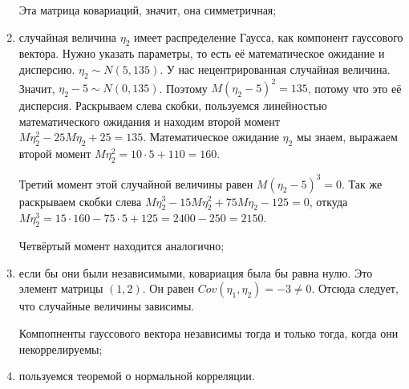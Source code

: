 \begin{enumerate}[label=\alph*)]
  Эта матрица ковариаций, значит, она симметричная;
  \item случайная величина $ \eta_2$ имеет распределение Гаусса, как компонент гауссового вектора.
  Нужно указать параметры, то есть её математическое ожидание и дисперсию.
  $ \eta_2 \sim N \left( 5, 135 \right) $.
  У нас нецентрированная случайная величина.
  Значит, $ \eta_2 - 5 \sim N \left( 0, 135 \right) $.
  Поэтому $M \left( \eta_2 - 5 \right)^2 = 135$, потому что это её дисперсия.
  Раскрываем слева скобки,
  пользуемся линейностью математического ожидания и находим второй момент
  $M \eta_2^2 - 25M \eta_2 + 25 =
    135$.
  Математическое ожидание $ \eta_2$ мы знаем,
  выражаем второй момент $M \eta_2^2 = 10 \cdot 5 + 110 = 160$.

  Третий момент этой случайной величины равен $M \left( \eta_2 - 5 \right)^3 = 0$.
  Так же раскрываем скобки слева $M \eta_2^3 - 15M \eta_2^2 + 75M \eta_2 - 125 = 0$,
  откуда $M \eta_2^3 = 15 \cdot 160 - 75 \cdot 5 + 125 = 2400 - 250 = 2150$.

  Четвёртый момент находится аналогично;
  \item если бы они были независимыми, ковариация была бы равна нулю.
  Это элемент матрицы $ \left( 1, 2 \right) $.
  Он равен $Cov \left( \eta_1, \eta_2 \right) = -3 \neq 0$.
  Отсюда следует, что случайные величины зависимы.

  Компопненты гауссового вектора независимы тогда и только тогда, когда они некоррелируемы;
  \item пользуемся теоремой о нормальной корреляции.


\end{enumerate}
